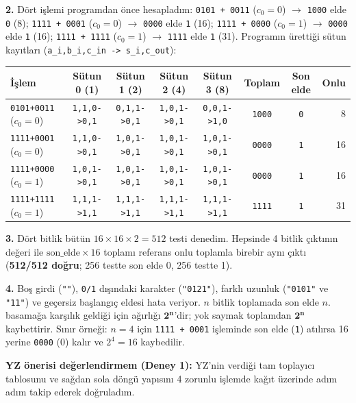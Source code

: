 \documentclass[10pt,a4paper]{article}
\begin{document}
\textbf{2.} Dört işlemi programdan önce hesapladım: \texttt{0101 + 0011} ($c_0=0$) $\rightarrow$ \texttt{1000} elde \texttt{0} (8); \texttt{1111 + 0001} ($c_0=0$) $\rightarrow$ \texttt{0000} elde \texttt{1} (16); \texttt{1111 + 0000} ($c_0=1$) $\rightarrow$ \texttt{0000} elde \texttt{1} (16); \texttt{1111 + 1111} ($c_0=1$) $\rightarrow$ \texttt{1111} elde \texttt{1} (31). Programın ürettiği sütun kayıtları (\texttt{a\_i,b\_i,c\_in -> s\_i,c\_out}):

\begin{center}
\small
\begin{tabular}{lccccccr}
\toprule
İşlem & Sütun 0 (1) & Sütun 1 (2) & Sütun 2 (4) & Sütun 3 (8) & Toplam & Son elde & Onlu \\
\midrule
\texttt{0101+0011} ($c_0=0$) & \texttt{1,1,0->0,1} & \texttt{0,1,1->0,1} & \texttt{1,0,1->0,1} & \texttt{0,0,1->1,0} & \texttt{1000} & \texttt{0} & 8 \\
\texttt{1111+0001} ($c_0=0$) & \texttt{1,1,0->0,1} & \texttt{1,0,1->0,1} & \texttt{1,0,1->0,1} & \texttt{1,0,1->0,1} & \texttt{0000} & \texttt{1} & 16 \\
\texttt{1111+0000} ($c_0=1$) & \texttt{1,0,1->0,1} & \texttt{1,0,1->0,1} & \texttt{1,0,1->0,1} & \texttt{1,0,1->0,1} & \texttt{0000} & \texttt{1} & 16 \\
\texttt{1111+1111} ($c_0=1$) & \texttt{1,1,1->1,1} & \texttt{1,1,1->1,1} & \texttt{1,1,1->1,1} & \texttt{1,1,1->1,1} & \texttt{1111} & \texttt{1} & 31 \\
\bottomrule
\end{tabular}
\end{center}

\textbf{3.} Dört bitlik bütün $16 \times 16 \times 2 = 512$ testi denedim. Hepsinde 4 bitlik çıktının değeri ile $\text{son\_elde} \times 16$ toplamı referans onlu toplamla birebir aynı çıktı (\textbf{512/512 doğru}; 256 testte son elde 0, 256 testte 1).

\textbf{4.} Boş girdi (\texttt{""}), \texttt{0/1} dışındaki karakter (\texttt{"0121"}), farklı uzunluk (\texttt{"0101"} ve \texttt{"11"}) ve geçersiz başlangıç eldesi hata veriyor. $n$ bitlik toplamada son elde $n$. basamağa karşılık geldiği için ağırlığı $\mathbf{2^n}$'dir; yok saymak toplamdan $\mathbf{2^n}$ kaybettirir. Sınır örneği: $n=4$ için \texttt{1111 + 0001} işleminde son elde (\texttt{1}) atılırsa 16 yerine \texttt{0000} (0) kalır ve $2^4 = 16$ kaybedilir.

\textbf{YZ önerisi değerlendirmem (Deney 1):} YZ'nin verdiği tam toplayıcı tablosunu ve sağdan sola döngü yapısını 4 zorunlu işlemde kağıt üzerinde adım adım takip ederek doğruladım.
\end{document}
